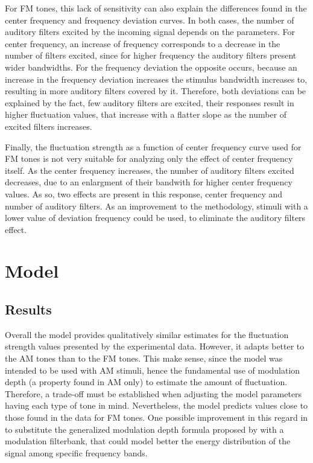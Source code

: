 \documentclass[../main.tex]{subfiles}
\begin{document}
For \gls{FM} tones, this lack of sensitivity can also explain the differences
found in the center frequency and frequency deviation curves. In both cases,
the number of auditory filters excited by the incoming signal depends on
the parameters. For center frequency, an increase of frequency corresponds to a
decrease in the number of filters excited, since for higher frequency the
auditory filters present wider bandwidths. For the frequency deviation the
opposite occurs, because an increase in the frequency deviation increases the
stimulus bandwidth increases to, resulting in more auditory filters covered
by it. Therefore, both deviations can be explained by the fact, few auditory
filters are excited, their responses result in higher fluctuation values, that
increase with a flatter slope as the number of excited filters increases.

Finally, the fluctuation strength as a function of center frequency curve used
for \gls{FM} tones is not very suitable for analyzing only the effect of center
frequency itself. As the center frequency increases, the number of auditory
filters excited decreases, due to an enlargment of their bandwith for higher
center frequency values. As so, two effects are present in this response, center
frequency and number of auditory filters. As an improvement to the methodology,
stimuli with a lower value of deviation frequency could be used, to eliminate
the auditory filters effect.

\section{Model}

\subsection{Results}

Overall the model provides qualitatively similar estimates for the fluctuation
strength values presented by the experimental data. However, it adapts better to
the \gls{AM} tones than to the \gls{FM} tones. This make sense, since the model
was intended to be used with \gls{AM} stimuli, hence the fundamental use of
modulation depth (a property found in \gls{AM} only) to estimate the amount of
fluctuation. Therefore, a trade-off must be established when adjusting the model
parameters having each type of tone in mind. Nevertheless, the model predicts
values close to those found in the data for \gls{FM} tones. One possible
improvement in this regard in to substitute the generalized modulation depth
formula proposed by \citeauthor{daniel1997psychoacoustical} with a modulation
filterbank, that could model better the energy distribution of the signal
among specific frequency bands.
\end{document}
